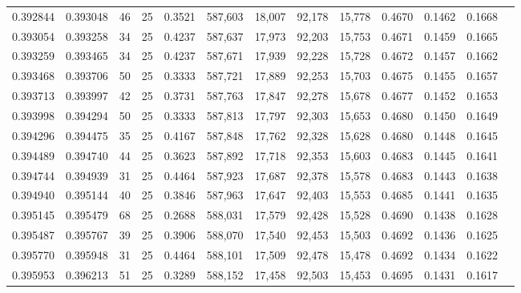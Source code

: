 \begin{tabular}{rrrrrrrrrrrrr}
0.392844 & 0.393048 &    46 &  25 &                                     0.3521 & 587,603 &  18,007 &  92,178 &  15,778 & 0.4670 & 0.1462 & 0.1668 \\
0.393054 & 0.393258 &    34 &  25 &                                     0.4237 & 587,637 &  17,973 &  92,203 &  15,753 & 0.4671 & 0.1459 & 0.1665 \\
0.393259 & 0.393465 &    34 &  25 &                                     0.4237 & 587,671 &  17,939 &  92,228 &  15,728 & 0.4672 & 0.1457 & 0.1662 \\
0.393468 & 0.393706 &    50 &  25 &                                     0.3333 & 587,721 &  17,889 &  92,253 &  15,703 & 0.4675 & 0.1455 & 0.1657 \\
0.393713 & 0.393997 &    42 &  25 &                                     0.3731 & 587,763 &  17,847 &  92,278 &  15,678 & 0.4677 & 0.1452 & 0.1653 \\
0.393998 & 0.394294 &    50 &  25 &                                     0.3333 & 587,813 &  17,797 &  92,303 &  15,653 & 0.4680 & 0.1450 & 0.1649 \\
0.394296 & 0.394475 &    35 &  25 &                                     0.4167 & 587,848 &  17,762 &  92,328 &  15,628 & 0.4680 & 0.1448 & 0.1645 \\
0.394489 & 0.394740 &    44 &  25 &                                     0.3623 & 587,892 &  17,718 &  92,353 &  15,603 & 0.4683 & 0.1445 & 0.1641 \\
0.394744 & 0.394939 &    31 &  25 &                                     0.4464 & 587,923 &  17,687 &  92,378 &  15,578 & 0.4683 & 0.1443 & 0.1638 \\
0.394940 & 0.395144 &    40 &  25 &                                     0.3846 & 587,963 &  17,647 &  92,403 &  15,553 & 0.4685 & 0.1441 & 0.1635 \\
0.395145 & 0.395479 &    68 &  25 &                                     0.2688 & 588,031 &  17,579 &  92,428 &  15,528 & 0.4690 & 0.1438 & 0.1628 \\
0.395487 & 0.395767 &    39 &  25 &                                     0.3906 & 588,070 &  17,540 &  92,453 &  15,503 & 0.4692 & 0.1436 & 0.1625 \\
0.395770 & 0.395948 &    31 &  25 &                                     0.4464 & 588,101 &  17,509 &  92,478 &  15,478 & 0.4692 & 0.1434 & 0.1622 \\
0.395953 & 0.396213 &    51 &  25 &                                     0.3289 & 588,152 &  17,458 &  92,503 &  15,453 & 0.4695 & 0.1431 & 0.1617 \\

\end{tabular}
